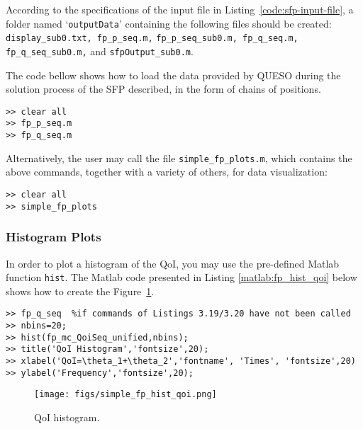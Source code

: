 According to the specifications of the input file in Listing~\ref{code:sfp-input-file}, a folder named `\verb+outputData+' containing the following files should be created: \verb+display_sub0.txt, fp_p_seq.m,+ \linebreak \verb+fp_p_seq_sub0.m, fp_q_seq.m, fp_q_seq_sub0.m,+ and \verb+sfpOutput_sub0.m+.

The code bellow shows how to load the data provided by QUESO during the solution process of the SFP described, in the form of chains of positions.
\begin{lstlisting}[caption={Matlab code for loading the data in both parameter and QoI chains of the SFP.}]
% inside Matlab
>> clear all
>> fp_p_seq.m
>> fp_q_seq.m
\end{lstlisting}


Alternatively, the user may call the file \texttt{simple\_fp\_plots.m}, which contains the above commands, together with a variety of others, for data visualization:
\begin{lstlisting}[caption={Matlab code for loading the data in both parameter and QoI chains of the SFP, by calling the file \texttt{simple\_fp\_plots.m}.}]
% inside Matlab
>> clear all
>> simple_fp_plots
\end{lstlisting}




\subsubsection{Histogram Plots}

In order to plot a histogram of the QoI, you may use the pre-defined Matlab function \verb+hist+.
The Matlab code presented in Listing \ref{matlab:fp_hist_qoi} below shows how to create the Figure~\ref{fig:fp_qoi_hist}.

\begin{lstlisting}[label=matlab:fp_hist_qoi,caption={Matlab code for the QoI histogram plot.}]
% inside Matlab
>> fp_q_seq  %if commands of Listings 3.19/3.20 have not been called
>> nbins=20;
>> hist(fp_mc_QoiSeq_unified,nbins);
>> title('QoI Histogram','fontsize',20);
>> xlabel('QoI=\theta_1+\theta_2','fontname', 'Times', 'fontsize',20)
>> ylabel('Frequency','fontsize',20);
\end{lstlisting}

\begin{figure}[p]
\centering 
\texttt{[image: figs/simple\_fp\_hist\_qoi.png]}
\vspace{-10pt}
\caption{QoI histogram.}
\label{fig:fp_qoi_hist}
\end{figure}

